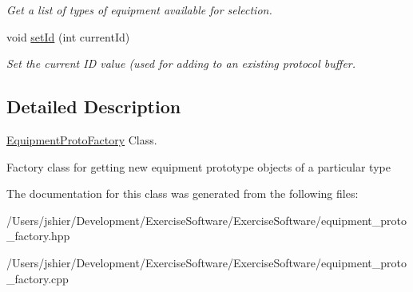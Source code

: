\begin{DoxyCompactItemize}
\begin{DoxyCompactList}\small\item\em Get a list of types of equipment available for selection. \end{DoxyCompactList}\item 
\hypertarget{class_equipment_proto_factory_ac6de35115a2c9ddd94d0d79dd7f23d60}{}void \hyperlink{class_equipment_proto_factory_ac6de35115a2c9ddd94d0d79dd7f23d60}{set\+Id} (int current\+Id)\label{class_equipment_proto_factory_ac6de35115a2c9ddd94d0d79dd7f23d60}

\begin{DoxyCompactList}\small\item\em Set the current I\+D value (used for adding to an existing protocol buffer. \end{DoxyCompactList}\end{DoxyCompactItemize}


\subsection{Detailed Description}
\hyperlink{class_equipment_proto_factory}{Equipment\+Proto\+Factory} Class. 

Factory class for getting new equipment prototype objects of a particular type 

The documentation for this class was generated from the following files\+:\begin{DoxyCompactItemize}
\item 
/\+Users/jshier/\+Development/\+Exercise\+Software/\+Exercise\+Software/equipment\+\_\+proto\+\_\+factory.\+hpp\item 
/\+Users/jshier/\+Development/\+Exercise\+Software/\+Exercise\+Software/equipment\+\_\+proto\+\_\+factory.\+cpp\end{DoxyCompactItemize}
